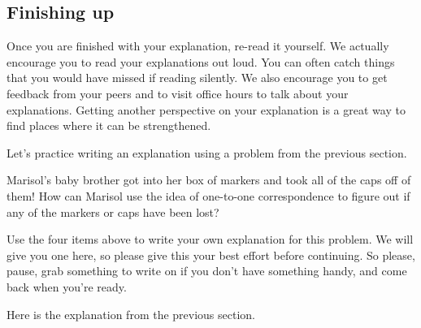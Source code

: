 \documentclass[noauthor,nooutcomes]{ximera}
\begin{document}
\subsection{Finishing up}
Once you are finished with your explanation, re-read it yourself. We actually encourage you to read your explanations out loud. You can often catch things that you would have missed if reading silently. We also encourage you to get feedback from your peers and to visit office hours to talk about your explanations. Getting another perspective on your explanation is a great way to find places where it can be strengthened.


Let's practice writing an explanation using a problem from the previous section.



\begin{problem}
Marisol's baby brother got into her box of markers and took all of the caps off of them! How can Marisol  use the idea of one-to-one correspondence to figure out if any of the markers or caps have been lost?

\begin{prompt}
Use the four items above to write your own explanation for this problem. We will give you one here, so please give this your best effort before continuing. So please, pause, grab something to write on if you don't have something handy, and come back when you're ready.

\begin{multipleChoice}
\end{multipleChoice}
\end{prompt}


\begin{problem} 
Here is the explanation from the previous section.


\end{problem}
\end{problem}
\end{document}
